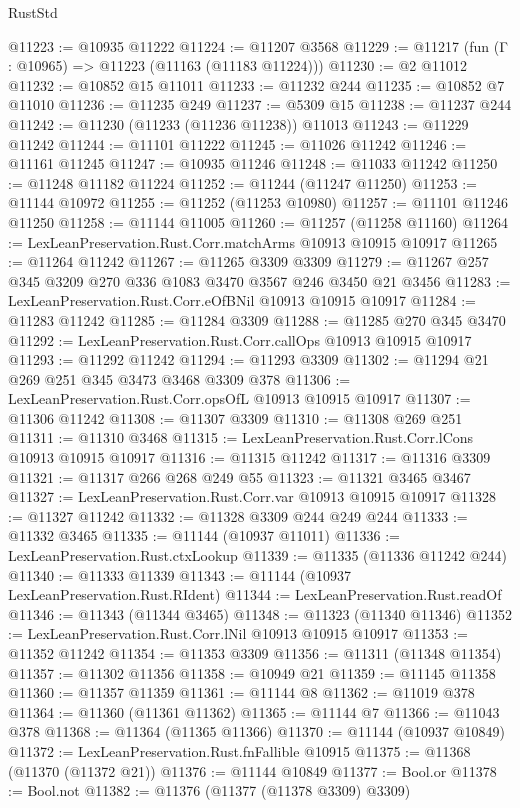 \begin{lexlean}{RustStd}
\begin{coremodule}
{\begin{coremodule}
{{{{{{{{{{{{{{{{{{{{{{{{{{{{{{{{{{{{{{{{{{{{{{{{{{{{{{{{{{{{{{{{{{{{{{{{{{{{{{{{{{{{{@11223 := @10935 @11222
@11224 := @11207 @3568
@11229 := @11217 (fun (Γ : @10965) => @11223 (@11163 (@11183 @11224)))
@11230 := @2 @11012
@11232 := @10852 @15 @11011
@11233 := @11232 @244
@11235 := @10852 @7 @11010
@11236 := @11235 @249
@11237 := @5309 @15
@11238 := @11237 @244
@11242 := @11230 (@11233 (@11236 @11238)) @11013
@11243 := @11229 @11242
@11244 := @11101 @11222
@11245 := @11026 @11242
@11246 := @11161 @11245
@11247 := @10935 @11246
@11248 := @11033 @11242
@11250 := @11248 @11182 @11224
@11252 := @11244 (@11247 @11250)
@11253 := @11144 @10972
@11255 := @11252 (@11253 @10980)
@11257 := @11101 @11246 @11250
@11258 := @11144 @11005
@11260 := @11257 (@11258 @11160)
@11264 := LexLeanPreservation.Rust.Corr.matchArms @10913 @10915 @10917
@11265 := @11264 @11242
@11267 := @11265 @3309 @3309
@11279 := @11267 @257 @345 @3209 @270 @336 @1083 @3470 @3567 @246 @3450 @21 @3456
@11283 := LexLeanPreservation.Rust.Corr.eOfBNil @10913 @10915 @10917
@11284 := @11283 @11242
@11285 := @11284 @3309
@11288 := @11285 @270 @345 @3470
@11292 := LexLeanPreservation.Rust.Corr.callOps @10913 @10915 @10917
@11293 := @11292 @11242
@11294 := @11293 @3309
@11302 := @11294 @21 @269 @251 @345 @3473 @3468 @3309 @378
@11306 := LexLeanPreservation.Rust.Corr.opsOfL @10913 @10915 @10917
@11307 := @11306 @11242
@11308 := @11307 @3309
@11310 := @11308 @269 @251
@11311 := @11310 @3468
@11315 := LexLeanPreservation.Rust.Corr.lCons @10913 @10915 @10917
@11316 := @11315 @11242
@11317 := @11316 @3309
@11321 := @11317 @266 @268 @249 @55
@11323 := @11321 @3465 @3467
@11327 := LexLeanPreservation.Rust.Corr.var @10913 @10915 @10917
@11328 := @11327 @11242
@11332 := @11328 @3309 @244 @249 @244
@11333 := @11332 @3465
@11335 := @11144 (@10937 @11011)
@11336 := LexLeanPreservation.Rust.ctxLookup
@11339 := @11335 (@11336 @11242 @244)
@11340 := @11333 @11339
@11343 := @11144 (@10937 LexLeanPreservation.Rust.RIdent)
@11344 := LexLeanPreservation.Rust.readOf
@11346 := @11343 (@11344 @3465)
@11348 := @11323 (@11340 @11346)
@11352 := LexLeanPreservation.Rust.Corr.lNil @10913 @10915 @10917
@11353 := @11352 @11242
@11354 := @11353 @3309
@11356 := @11311 (@11348 @11354)
@11357 := @11302 @11356
@11358 := @10949 @21
@11359 := @11145 @11358
@11360 := @11357 @11359
@11361 := @11144 @8
@11362 := @11019 @378
@11364 := @11360 (@11361 @11362)
@11365 := @11144 @7
@11366 := @11043 @378
@11368 := @11364 (@11365 @11366)
@11370 := @11144 (@10937 @10849)
@11372 := LexLeanPreservation.Rust.fnFallible @10915
@11375 := @11368 (@11370 (@11372 @21))
@11376 := @11144 @10849
@11377 := Bool.or
@11378 := Bool.not
@11382 := @11376 (@11377 (@11378 @3309) @3309)
}}}}}}}}}}}}}}}}}}}}}}}}}}}}}}}}}}}}}}}}}}}}}}}}}}}}}}}}}}}}}}}}}}}}}}}}}}}}}}}}}}}}}
\end{coremodule}}
\end{coremodule}
\end{lexlean}
